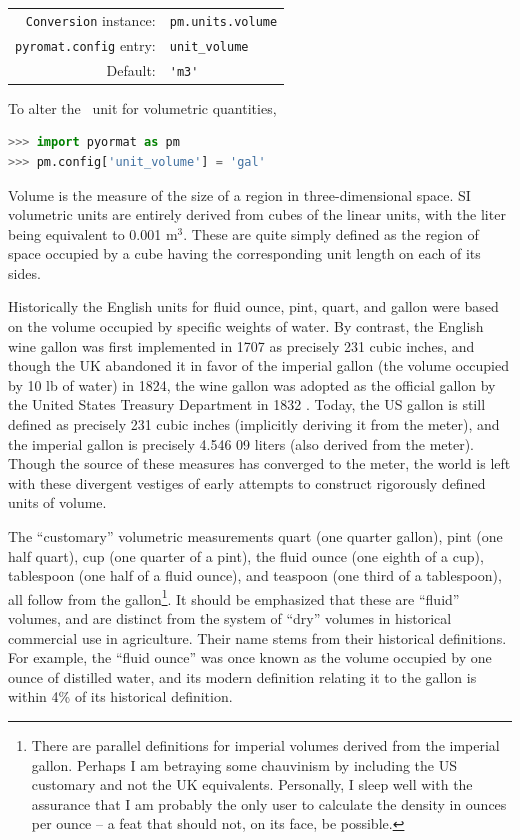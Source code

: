 \begin{tabular}{rl}
\hline
\verb|Conversion| instance: & \verb|pm.units.volume|\\
\verb|pyromat.config| entry: & \verb|unit_volume|\\
Default: & \verb|'m3'|\\
\hline
\end{tabular}
\vspace{1em}

To alter the \PM\ unit for volumetric quantities,
\begin{lstlisting}[language=Python]
>>> import pyormat as pm
>>> pm.config['unit_volume'] = 'gal'
\end{lstlisting}

Volume is the measure of the size of a region in three-dimensional space.  SI volumetric units are entirely derived from cubes of the linear units, with the liter being equivalent to 0.001 m$^3$.  These are quite simply defined as the region of space occupied by a cube having the corresponding unit length on each of its sides.

Historically the English units for fluid ounce, pint, quart, and gallon were based on the volume occupied by specific weights of water.  By contrast, the English wine gallon was first implemented in 1707 as precisely 231 cubic inches, and though the UK abandoned it in favor of the imperial gallon (the volume occupied by 10 lb of water) in 1824, the wine gallon was adopted as the official gallon by the United States Treasury Department in 1832 \cite{nbs:sp447}.  Today, the US gallon is still defined as precisely 231 cubic inches (implicitly deriving it from the meter), and the imperial gallon is precisely 4.546 09 liters (also derived from the meter).  Though the source of these measures has converged to the meter, the world is left with these divergent vestiges of early attempts to construct rigorously defined units of volume.

The ``customary'' volumetric measurements quart (one quarter gallon), pint (one half quart), cup (one quarter of a pint), the fluid ounce (one eighth of a cup), tablespoon (one half of a fluid ounce), and teaspoon (one third of a tablespoon), all follow from the gallon\footnote{There are parallel definitions for imperial volumes derived from the imperial gallon.  Perhaps I am betraying some chauvinism by including the US customary and not the UK equivalents.  Personally, I sleep well with the assurance that I am probably the only user to calculate the density in ounces per ounce -- a feat that should not, on its face, be possible.}.  It should be emphasized that these are ``fluid'' volumes, and are distinct from the system of ``dry'' volumes in historical commercial use in agriculture.  Their name stems from their historical definitions.  For example, the ``fluid ounce'' was once known as the volume occupied by one ounce of distilled water, and its modern definition relating it to the gallon is within 4\% of its historical definition.

